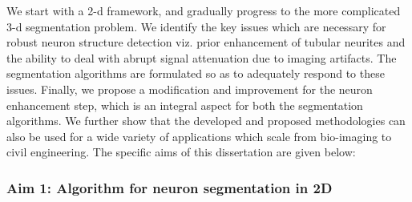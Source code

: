 We start with a 2-d framework, and gradually progress to the more complicated 3-d segmentation problem. We identify the key issues which are necessary for robust neuron structure detection viz. prior enhancement of tubular neurites and the ability to deal with abrupt signal attenuation due to imaging artifacts. The segmentation algorithms are formulated so as to adequately respond to these issues. Finally, we propose a modification and improvement for the neuron enhancement step, which is an integral aspect for both the segmentation algorithms. We further show that the developed and proposed methodologies can also be used for a wide variety of applications which scale from bio-imaging to civil engineering. The specific aims of this dissertation are given below:
%
%

\subsubsection*{Aim 1: Algorithm for neuron segmentation in 2D}

